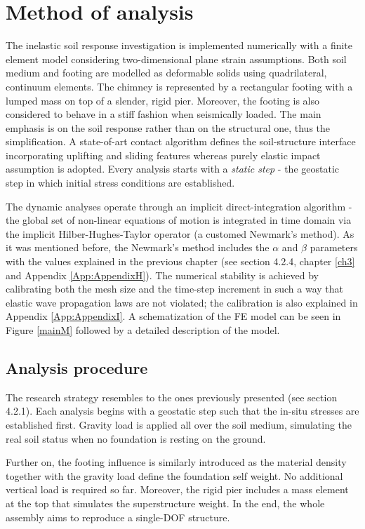 	
\section{Method of analysis}
The inelastic soil response investigation is implemented numerically with a finite element model considering two-dimensional plane strain assumptions. Both soil medium and \mbox{footing} are modelled as deformable solids using quadrilateral, continuum elements. The chimney is represented by a rectangular footing with a lumped mass on top of a slender, rigid pier. Moreover, the footing is also considered to behave in a stiff fashion when seismically loaded. The main emphasis is on the soil response rather than on the structural one, thus the simplification. A state-of-art contact algorithm defines the soil-structure interface incorporating uplifting and sliding features whereas purely elastic impact assumption is adopted. Every analysis starts with a \textit{static step} - the geostatic step in which initial stress conditions are established.  

The dynamic analyses operate through an implicit direct-integration algorithm - the global set of non-linear equations of motion is integrated in time domain via the implicit Hilber-Hughes-Taylor operator (a customed Newmark's method). As it was mentioned before, the Newmark's method includes the $\alpha$ and $\beta$ parameters with the values explained in the previous chapter (see section 4.2.4, chapter \ref{ch3} and Appendix \ref{App:AppendixH}). The numerical stability is achieved by calibrating both the mesh size and the time-step increment in such a way that elastic wave propagation laws are not violated; the calibration is also explained in Appendix \ref{App:AppendixI}. A schematization of the FE model can be seen in Figure \ref{mainM} followed by a detailed description of the model.

\subsection{Analysis procedure}
The research strategy resembles to the ones previously presented (see section 4.2.1). Each analysis begins with a geostatic step such that the in-situ stresses are established first. Gravity load is applied all over the soil medium, simulating the real soil status when no foundation is resting on the ground.

Further on, the footing influence is similarly introduced as the material density together with the gravity load define the foundation self weight. No additional vertical load is required so far. Moreover, the rigid pier includes a mass element at the top that simulates the superstructure weight. In the end, the whole assembly aims to reproduce a single-DOF structure.


